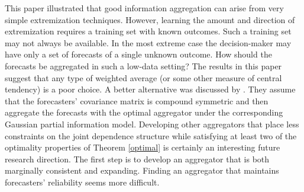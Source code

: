 \documentclass[11pt]{article}
\theoremstyle{definition}
\theoremstyle{definition}
\begin{document}
This paper illustrated that good information aggregation can arise from very simple extremization techniques. However, learning the amount and direction of extremization requires a training set with known outcomes. Such a training set may not always be available. In the most extreme case  the decision-maker may have only a set of forecasts of a single unknown outcome. How should the forecasts be aggregated in such a low-data setting? The results in this paper suggest that any type of weighted average (or some other measure of central tendency) is a poor choice. A better alternative was discussed by \cite{satopaamodeling}. They assume that the forecasters' covariance matrix is compound symmetric and then aggregate the forecasts with the optimal aggregator under the corresponding Gaussian partial information model. 
 Developing other aggregators that place less constraints on the joint dependence structure while satisfying at least two of the optimality properties of Theorem \ref{optimal} is certainly an interesting future research direction. The first step is to develop an aggregator that is both marginally consistent and expanding. Finding an aggregator that maintains forecasters' reliability seems more difficult. 




%
%
%
%
%
%
%
%
%
%
%
\end{document}
